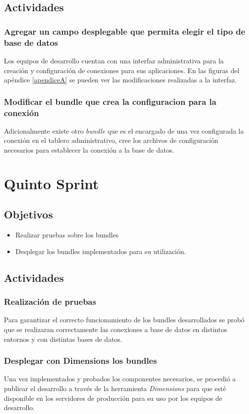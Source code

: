 \subsection{Actividades}
\subsubsection{Agregar un campo desplegable que permita elegir el tipo de base de datos}
Los equipos de desarrollo cuentan con una interfaz administrativa para la creación y configuración
de conexiones para sus aplicaciones. En las figuras del apéndice \ref{apendiceA} se pueden ver las
modificaciones realizadas a la interfaz.
\subsubsection{Modificar el bundle que crea la configuracion para la conexión}
Adicionalmente existe otro \emph{bundle} que es el encargado de una vez configurada la conexión
en el tablero administrativo, cree los archivos de configuración necesarios para establecer
la conexión a la base de datos.

\section{Quinto Sprint}

\subsection{Objetivos}
\begin{itemize}
  \item Realizar pruebas sobre los bundles
  \item Desplegar los bundles implementados para su utilización.
\end{itemize}
\subsection{Actividades}
\subsubsection{Realización de pruebas}
Para garantizar el correcto funcionamiento de los bundles desarrollados
se probó que se realizaran correctamente las conexiones a base de datos en distintos
entornos y con distintas bases de datos.
\subsubsection{Desplegar con Dimensions los bundles}
Una vez implementados y probados los componentes necesarios, se procedió a publicar
el desarrollo a través de la herramienta \emph{Dimensions} para que esté disponible
en los servidores de producción para su uso por los equipos de desarrollo.
